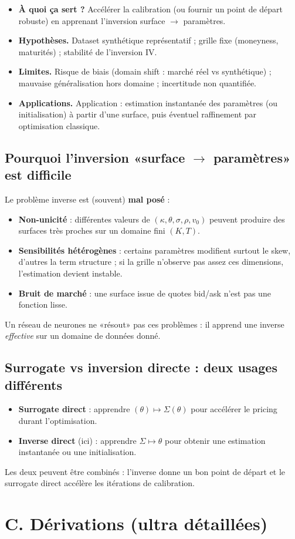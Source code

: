 \documentclass[11pt,a4paper]{report}
\theoremstyle{definition}
\theoremstyle{plain}
\theoremstyle{remark}
\newcommand{\1}{\mathbf{1}}
\newcommand{\qa}[4]{
\begin{itemize}[leftmargin=*]
\item \textbf{À quoi ça sert ?} #1
\item \textbf{Hypothèses.} #2
\item \textbf{Limites.} #3
\item \textbf{Applications.} #4
\end{itemize}
}
\begin{document}
\qa
{Accélérer la calibration (ou fournir un point de départ robuste) en apprenant l'inversion surface $\to$ paramètres.}
{Dataset synthétique représentatif ; grille fixe (moneyness, maturités) ; stabilité de l'inversion IV.}
{Risque de biais (domain shift : marché réel vs synthétique) ; mauvaise généralisation hors domaine ; incertitude non quantifiée.}
{Application : estimation instantanée des paramètres (ou initialisation) à partir d'une surface, puis éventuel raffinement par optimisation classique.}

\subsection*{Pourquoi l'inversion «surface $\to$ paramètres» est difficile}
Le problème inverse est (souvent) \textbf{mal posé} :
\begin{itemize}[leftmargin=*]
\item \textbf{Non-unicité} : différentes valeurs de $(\kappa,\theta,\sigma,\rho,v_0)$ peuvent produire des surfaces très proches sur un domaine fini $(K,T)$.
\item \textbf{Sensibilités hétérogènes} : certains paramètres modifient surtout le skew, d'autres la term structure ; si la grille n'observe pas assez ces dimensions, l'estimation devient instable.
\item \textbf{Bruit de marché} : une surface issue de quotes bid/ask n'est pas une fonction lisse.
\end{itemize}
Un réseau de neurones ne «résout» pas ces problèmes : il apprend une inverse \emph{effective} sur un domaine de données donné.

\subsection*{Surrogate vs inversion directe : deux usages différents}
\begin{itemize}[leftmargin=*]
\item \textbf{Surrogate direct} : apprendre $(\theta)\mapsto \Sigma(\theta)$ pour accélérer le pricing durant l'optimisation.
\item \textbf{Inverse direct} (ici) : apprendre $\Sigma\mapsto \theta$ pour obtenir une estimation instantanée ou une initialisation.
\end{itemize}
Les deux peuvent être combinés : l'inverse donne un bon point de départ et le surrogate direct accélère les itérations de calibration.

\section{C. Dérivations (ultra détaillées)}
\end{document}
